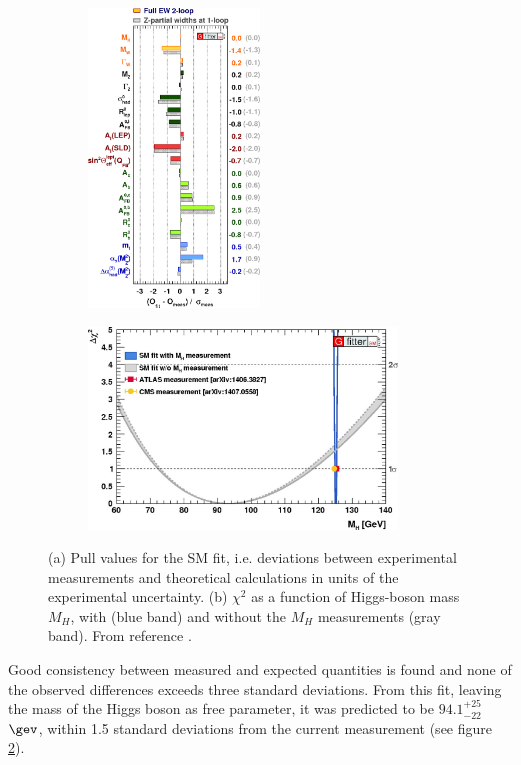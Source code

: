 \begin{figure}[t!]
\begin{subfigure}{0.5\textwidth}
  \centering
  \includegraphics[width=0.5\textwidth]{figures/Theory/fit1.jpg}
  \caption{}
  \label{fig:theo:fit1}
\end{subfigure}
\begin{subfigure}{0.5\textwidth}
  \centering
  \includegraphics[width=0.9\textwidth]{figures/Theory/fit2.jpg}
  \caption{}
  \label{fig:theo:fit2}
\end{subfigure}

\captionsetup{width=0.85\textwidth} \caption{\small (a) Pull values for the SM fit, i.e. deviations between experimental measurements and theoretical calculations in units of the experimental uncertainty. (b) $\chi^{2}$ as a function of Higgs-boson mass $M_{H}$, with (blue band) and without the $M_{H}$ measurements (gray band). From reference \cite{Baak:2013ppa}.}
\label{fig:theo:ewfit}
\end{figure}
Good consistency between measured and expected quantities is found and none of the observed differences exceeds three standard deviations. From this fit, leaving the mass of the Higgs boson as free parameter, it was predicted to be $94.1^{+25}_{-22}$ $\gev$, within 1.5 standard deviations from the current measurement (see figure \ref{fig:theo:fit2}). 

